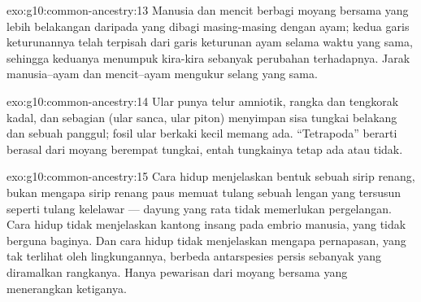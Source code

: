 \begin{solution}{exo:g10:common-ancestry:13}
Manusia dan mencit berbagi moyang bersama yang lebih belakangan
daripada yang dibagi masing-masing dengan ayam; kedua garis
keturunannya telah terpisah dari garis keturunan ayam selama waktu yang
sama, sehingga keduanya menumpuk kira-kira sebanyak perubahan
terhadapnya. Jarak manusia--ayam dan mencit--ayam mengukur selang yang sama.
\end{solution}

\begin{solution}{exo:g10:common-ancestry:14}
Ular punya telur amniotik, rangka dan tengkorak kadal, dan sebagian
(ular sanca, ular piton) menyimpan sisa tungkai belakang dan sebuah
panggul; fosil ular berkaki kecil memang ada. ``Tetrapoda'' berarti
berasal dari moyang berempat tungkai, entah tungkainya tetap ada atau tidak.
\end{solution}

\begin{solution}{exo:g10:common-ancestry:15}
Cara hidup menjelaskan bentuk sebuah sirip renang, bukan mengapa sirip
renang paus memuat tulang sebuah lengan yang tersusun seperti tulang
kelelawar --- dayung yang rata tidak memerlukan pergelangan. Cara hidup
tidak menjelaskan kantong insang pada embrio manusia, yang tidak
berguna baginya. Dan cara hidup tidak menjelaskan mengapa 
pernapasan, yang tak terlihat oleh lingkungannya, berbeda antarspesies
persis sebanyak yang diramalkan rangkanya. Hanya pewarisan dari moyang
bersama yang menerangkan ketiganya.
\end{solution}

